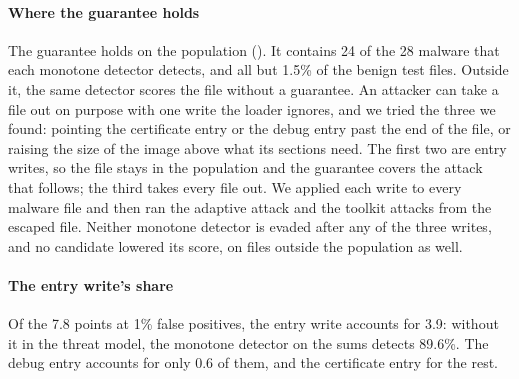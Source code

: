 \paragraph{Where the guarantee holds}
The guarantee holds on the population (). It contains 24 of the 28 malware that each
monotone detector detects, and all but 1.5\% of the benign test files. Outside it, the same detector scores the file
without a guarantee. An attacker can take a file out on purpose with one write the loader ignores, and we tried the
three we found: pointing the certificate entry or the debug entry past the end of the file, or raising the size of the
image above what its sections need. The first two are entry writes, so the file stays in the population and the
guarantee covers the attack that follows; the third takes every file out. We applied each write to every malware file
and then ran the adaptive attack and the toolkit attacks from the escaped file. Neither monotone detector is evaded
after any of the three writes, and no candidate lowered its score, on files outside the population as well.

\paragraph{The entry write's share}
Of the 7.8 points at 1\% false positives, the entry write accounts for 3.9: without it in the threat model, the
monotone detector on the sums detects 89.6\%. The debug entry accounts for only 0.6 of them, and the certificate entry
for the rest.

